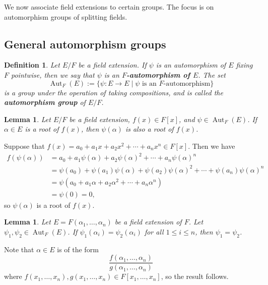\documentclass[10pt]{article}
\makeatletter
\DeclareMathOperator{\Aut}{Aut}
\theoremstyle{newstyle}
\newtheorem{lemma}[thm]{Lemma}
\newtheorem{defn}[thm]{Definition}
\newenvironment{pf}[1][\proofname]{\par
  \pushQED{\qed}%
  \normalfont \topsep0\p@\relax
  \trivlist
  \item[\hskip\labelsep\scshape
  #1\@addpunct{.}]\ignorespaces
}{%
  \popQED\endtrivlist\@endpefalse
}
\makeatother
\begin{document}
We now associate field extensions to certain groups. The focus is on automorphism groups of 
splitting fields. 

\subsection{General automorphism groups}

\begin{defn}
Let $E/F$ be a field extension. If $\psi$ is an automorphism of $E$ fixing $F$ pointwise, then
we say that $\psi$ is an {\bf $F$-automorphism of $E$}. The set 
\[ \Aut_F(E) := \{\psi : E \to E \mid \psi \text { is an $F$-automorphism}\} \]
is a group under the operation of taking compositions, and is called the 
{\bf automorphism group} of $E/F$. 
\end{defn}

\begin{lemma}
Let $E/F$ be a field extension, $f(x) \in F[x]$, and $\psi \in \Aut_F(E)$. If 
$\alpha \in E$ is a root of $f(x)$, then $\psi(\alpha)$ is also a root of $f(x)$. 
\end{lemma}
\begin{pf}
Suppose that $f(x) = a_0 + a_1x + a_2x^2 + \cdots + a_nx^n \in F[x]$. Then we have 
\begin{align*}
    f(\psi(\alpha)) &= a_0 + a_1 \psi(\alpha) + a_2 \psi(\alpha)^2 + \cdots + a_n \psi(\alpha)^n \\
    &= \psi(a_0) + \psi(a_1) \psi(\alpha) + \psi(a_2) \psi(\alpha)^2 + \cdots + \psi(a_n) \psi(\alpha)^n \\
    &= \psi(a_0 + a_1\alpha + a_2 \alpha^2 + \cdots + a_n \alpha^n) \\
    &= \psi(0) = 0,
\end{align*}
so $\psi(\alpha)$ is a root of $f(x)$. 
\end{pf}

\begin{lemma}
Let $E = F(\alpha_1, \dots, \alpha_n)$ be a field extension of $F$. Let $\psi_1, \psi_2 \in 
\Aut_F(E)$. If $\psi_1(\alpha_i) = \psi_2(\alpha_i)$ for all $1 \leq i \leq n$, then 
$\psi_1 = \psi_2$. 
\end{lemma}
\begin{pf}
Note that $\alpha \in E$ is of the form 
\[ \frac{f(\alpha_1, \dots, \alpha_n)}{g(\alpha_1, \dots, \alpha_n)} \]
where $f(x_1, \dots, x_n), g(x_1, \dots, x_n) \in F[x_1, \dots, x_n]$, so the result follows. 
\end{pf}
\end{document}
